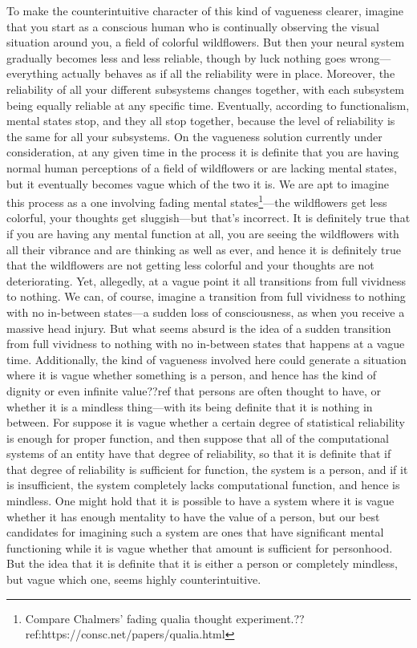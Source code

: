 To make the counterintuitive character of this kind of vagueness clearer, imagine that you start as a conscious human
who is continually observing the visual situation around you, a field of colorful wildflowers. But then your neural system gradually 
becomes less and less reliable, though by luck nothing goes wrong---everything actually behaves as if all the reliability were 
in place. Moreover, the reliability of all your different subsystems changes together, with each subsystem being equally reliable at any specific time. Eventually, according to functionalism, mental states 
stop, and they all stop together, because the level of reliability is the same for all your subsystems. On the vagueness
solution currently under consideration, at any given time in the process it is definite that you 
are having normal human perceptions of a field of wildflowers or are lacking mental states, but it eventually becomes vague which of the two it is.
We are apt to imagine this process as a one involving fading mental states\footnote{Compare Chalmers' fading qualia thought experiment.??ref:https://consc.net/papers/qualia.html}---the wildflowers get less colorful, your thoughts get 
sluggish---but that's incorrect. It is definitely true that if you are having any mental function at all, you are seeing 
the wildflowers with all their vibrance and are thinking as well as ever, and hence it is definitely true that the 
wildflowers are not getting less colorful and your thoughts are not deteriorating. Yet, allegedly, at a vague point 
it all transitions from full vividness to nothing. We can, of course, imagine a transition from full vividness to nothing
with no in-between states---a sudden loss of consciousness, as when you receive a massive head injury. But what 
seems absurd is the idea of a sudden transition from full vividness to nothing with no in-between states that 
happens at a vague time.
Additionally, the kind of vagueness involved here could generate a situation where it is vague whether something is a 
person, and hence has the kind of dignity or even infinite value??ref that persons are often thought to have, or whether
it is a mindless thing---with its being definite that it is nothing in between. For suppose it is vague whether
a certain degree of statistical reliability is enough for proper function, and then suppose that all of the computational 
systems of an entity have that degree of reliability, so that it is definite that if that degree of reliability is sufficient
for function, the system is a person, and if it is insufficient, the system completely lacks computational function, and hence
is mindless. One might hold that it is possible to have a system where it is vague whether it has enough mentality to have 
the value of a person, but our best candidates for imagining such a system are ones that have significant mental functioning while it is vague whether that amount is sufficient for personhood. But the idea that it is definite that it is either a 
person or completely mindless, but vague which one, seems highly counterintuitive.

